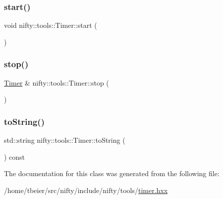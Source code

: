 \mbox{\label{classnifty_1_1tools_1_1Timer_a0167833955c7125f150098b40bd9cdff}} 
\subsubsection{\texorpdfstring{start()}{start()}}
{\footnotesize\ttfamily void nifty\+::tools\+::\+Timer\+::start (\begin{DoxyParamCaption}{ }\end{DoxyParamCaption})\hspace{0.3cm}{\ttfamily [inline]}}

\mbox{\label{classnifty_1_1tools_1_1Timer_ac45248ef59cb5b742566fde4f64ddada}} 
\subsubsection{\texorpdfstring{stop()}{stop()}}
{\footnotesize\ttfamily \hyperlink{classnifty_1_1tools_1_1Timer}{Timer} \& nifty\+::tools\+::\+Timer\+::stop (\begin{DoxyParamCaption}{ }\end{DoxyParamCaption})\hspace{0.3cm}{\ttfamily [inline]}}

\mbox{\label{classnifty_1_1tools_1_1Timer_afd3767420c4c3dc2b20a87684d5b86df}} 
\subsubsection{\texorpdfstring{to\+String()}{toString()}}
{\footnotesize\ttfamily std\+::string nifty\+::tools\+::\+Timer\+::to\+String (\begin{DoxyParamCaption}{ }\end{DoxyParamCaption}) const\hspace{0.3cm}{\ttfamily [inline]}}



The documentation for this class was generated from the following file\+:\begin{DoxyCompactItemize}
\item 
/home/tbeier/src/nifty/include/nifty/tools/\hyperlink{timer_8hxx}{timer.\+hxx}\end{DoxyCompactItemize}
